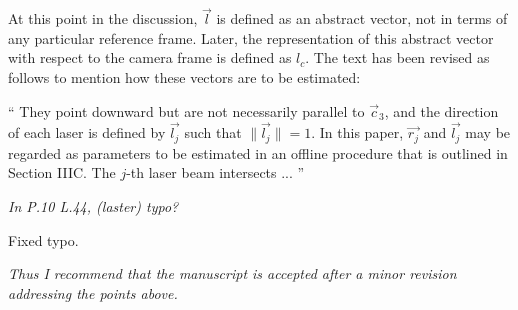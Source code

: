 \documentclass[11pt]{article}
\newenvironment{correction}{\begin{list}{}{\setlength{\leftmargin}{1cm}\setlength{\rightmargin}{1cm}}\vspace{\parsep}\item[]``}{''\end{list}}
\begin{document}
\begin{itemize}
At this point in the discussion, $\vec{l}$ is defined as an abstract vector, not in terms of any particular reference frame. Later, the representation of this abstract vector with respect to the camera frame is defined as $l_c$. The text has been revised as follows to mention how these vectors are to be estimated:

\begin{correction}
They point downward but are not
  necessarily parallel to $\vec{c}_3$, and the direction of each
laser is defined by $\vec{l_j}$ such that $\| \vec{l_j} \| = 1$. 
In this paper, $\vec{r_j}$ and $\vec{l_j}$ may be regarded as parameters
to be estimated in an offline procedure that is outlined in Section IIIC.
The $j$-th laser beam intersects ...
\end{correction}

\item
\textit{
In P.10 L.44, (laster) typo? 
}

Fixed typo.

\end{itemize}

\noindent\textit{
Thus I recommend that the manuscript is accepted after a minor revision addressing the points above.
}
\end{document}
